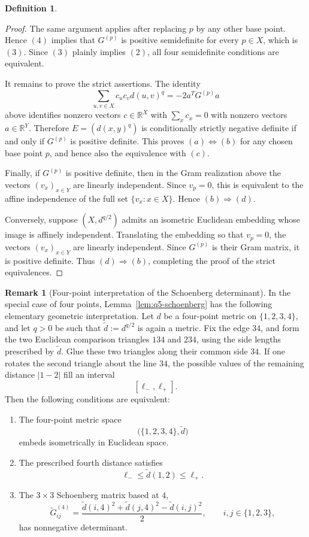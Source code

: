 \documentclass[12pt]{amsart}
\theoremstyle{definition}
\newtheorem{definition}[theorem]{Definition}
\newtheorem{remark}[theorem]{Remark}
\newcommand{\1}{\mathbf{1}}
\begin{document}
\begin{definition}
\begin{proof}
The same argument applies after replacing $p$ by any other base point. Hence
$(4)$ implies that $G^{(p)}$ is positive semidefinite for every $p\in X$,
which is $(3)$. Since $(3)$ plainly implies $(2)$, all four semidefinite
conditions are equivalent.

It remains to prove the strict assertions. The identity
\[
        \sum_{u,v\in X} c_uc_v d(u,v)^q
        =
        -2a^T G^{(p)}a
\]
above identifies nonzero vectors $c\in\mathbb{R}^X$ with $\sum_x c_x=0$
with nonzero vectors $a\in\mathbb{R}^{Y}$. Therefore $E=(d(x,y)^q)$ is
conditionally strictly negative definite if and only if $G^{(p)}$ is positive
definite. This proves $(a)\Longleftrightarrow (b)$ for any chosen base point
$p$, and hence also the equivalence with $(c)$.

Finally, if $G^{(p)}$ is positive definite, then in the Gram realization above
the vectors $(v_x)_{x\in Y}$ are linearly independent. Since $v_p=0$, this is
equivalent to the affine independence of the full set
$\{v_x:x\in X\}$. Hence $(b)\Longrightarrow (d)$.

Conversely, suppose $(X,d^{q/2})$ admits an isometric Euclidean embedding
whose image is affinely independent. Translating the embedding so that
$v_p=0$, the vectors $(v_x)_{x\in Y}$ are linearly independent. Since
$G^{(p)}$ is their Gram matrix, it is positive definite. Thus
$(d)\Longrightarrow (b)$, completing the proof of the strict equivalences.
\end{proof}

\begin{remark}[Four-point interpretation of the Schoenberg determinant]
\label{rem:four-point-schoenberg-determinant}
In the special case of four points, Lemma~\ref{lem:q5-schoenberg}
has the following elementary geometric interpretation. Let $d$ be a
four-point metric on $\{1,2,3,4\}$, and let $q>0$ be such that
$\widetilde d:=d^{q/2}$ is again a metric. Fix the edge $34$, and form
the two Euclidean comparison triangles $134$ and $234$, using the side
lengths prescribed by $\widetilde d$. Glue these two triangles along their
common side $34$. If one rotates the second triangle about the line $34$,
the possible values of the remaining distance $|1-2|$ fill an interval
\[
        [\ell_-,\ell_+].
\]
Then the following conditions are equivalent:
\begin{enumerate}
\item The four-point metric space
\[
        \bigl(\{1,2,3,4\},\widetilde d\bigr)
\]
embeds isometrically in Euclidean space.
\item The prescribed fourth distance satisfies
\[
        \ell_- \le \widetilde d(1,2) \le \ell_+ .
\]
\item The $3\times 3$ Schoenberg matrix based at $4$,
\[
        \widetilde G^{(4)}_{ij}
        =
        \frac{\widetilde d(i,4)^2+\widetilde d(j,4)^2-\widetilde d(i,j)^2}{2},
        \qquad i,j\in\{1,2,3\},
\]
has nonnegative determinant.
\end{enumerate}


\end{remark}
\end{definition}
\end{document}
